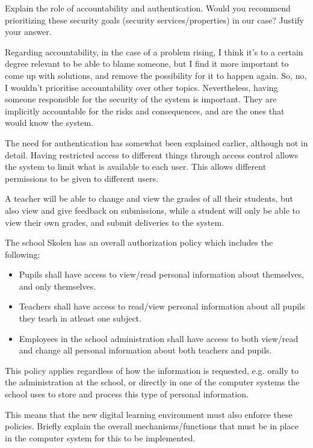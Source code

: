 \documentclass{myassignment}
\begin{document}
	\begin{problem}
		Explain the role of accountability and authentication. Would you recommend prioritizing these security goals (security services/properties) in our case? Justify your answer.%
	\end{problem}

	\begin{answer}
		Regarding accountability, in the case of a problem rising, I think it's to a certain degree relevant to be able to blame someone, but I find it more important to come up with solutions, and remove the possibility for it to happen again. So, no, I wouldn't prioritise accountability over other topics. Nevertheless, having someone responsible for the security of the system is important. They are implicitly accountable for the risks and consequences, and are the ones that would know the system.

		The need for authentication has somewhat been explained earlier, although not in detail. Having restricted access to different things through access control allows the system to limit what is available to each user. This allows different permissions to be given to different users. 
 
		A teacher will be able to change and view the grades of all their students, but also view and give feedback on submissions, while a student will only be able to view their own grades, and submit deliveries to the system.
	\end{answer}

	\begin{problem}
		The school Skolen has an overall authorization policy which includes the following:%
		\begin{itemize}[label=---,leftmargin=5em]
			\setlength\itemsep{0em}
			\item Pupils shall have access to view/read personal information about themselves, and only themselves.%
			\item Teachers shall have access to read/view personal information about all pupils they teach in atleast one subject.%
			\item Employees in the school administration shall have access to both view/read and change all personal information about both teachers and pupils.%
		\end{itemize}

		This policy applies regardless of how the information is requested, e.g. orally to the administration at the school, or directly in one of the computer systems the school uses to store and process this type of personal information.
		
		This means that the new digital learning environment must also enforce these policies. Briefly explain the overall mechanisms/functions that must be in place in the computer system for this to be implemented.%
	\end{problem}
\end{document}
